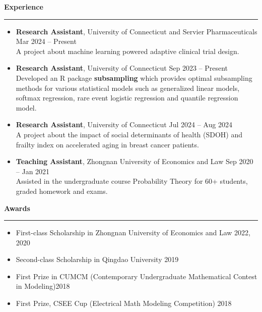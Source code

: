 \documentclass[a4paper,10pt]{article}
\newcommand{\resheading}[1]{
  \vspace{8pt}
  \noindent\textbf{\large #1}
  \vspace{4pt}
  \hrule
  \vspace{8pt}
}
\begin{document}
\resheading{Experience}
\begin{itemize}[left=0pt, label={}]

    \item \textbf{Research Assistant}, University of Connecticut and Servier Pharmaceuticals \hfill Mar 2024 -- Present \\
    A project about machine learning powered adaptive clinical trial design.

       
    \item \textbf{Research Assistant}, University of Connecticut \hfill Sep 2023 -- Present \\
    Developed an R package \textbf{subsampling} which provides optimal subsampling methods for various statistical models such as generalized linear models, softmax regression, rare event logistic regression and quantile regression model.
      
    \item \textbf{Research Assistant}, University of Connecticut \hfill Jul 2024 -- Aug 2024 \\
    A project about the impact of social determinants of health (SDOH) and frailty index on accelerated aging in breast cancer patients.
    
    \item \textbf{Teaching Assistant}, Zhongnan University of Economics and Law \hfill Sep 2020 -- Jan 2021 \\
    Assisted in the undergraduate course Probability Theory for 60+ students, graded homework and exams.
  \end{itemize}
  
\resheading{Awards}
\begin{itemize}[left=0pt, label={}]
    \item First-class Scholarship in Zhongnan University of Economics and Law \hfill 2022, 2020 \\
    \item Second-class Scholarship in Qingdao University \hfill 2019  \\
    \item First Prize in CUMCM (Contemporary Undergraduate Mathematical Contest in Modeling)\hfill 2018  \\
    \item First Prize, CSEE Cup (Electrical Math Modeling Competition) \hfill 2018  \\
\end{itemize}
\end{document}
